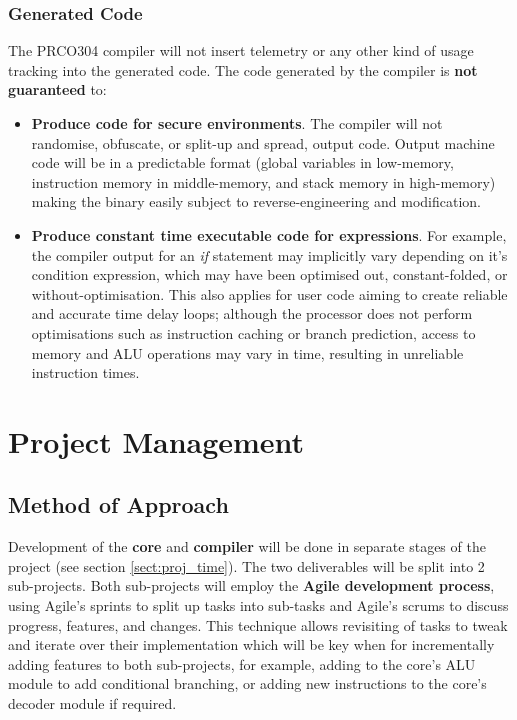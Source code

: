 \documentclass[11pt,a4paper]{report}
\newcommand{\scname}{PRCO304}
\begin{document}
\subsection{Generated Code}
The \scname{} compiler will not insert telemetry or any other kind of usage tracking into the generated code.
The code generated by the compiler is \textbf{not guaranteed} to:
\begin{itemize}
\item{\textbf{Produce code for secure environments}. The compiler will not randomise, obfuscate, or split-up and spread, output code. Output machine code will be in a predictable format (global variables in low-memory, instruction memory in middle-memory, and stack memory in high-memory) making the binary easily subject to reverse-engineering and modification.}
\item{\textbf{Produce constant time executable code for expressions}. For example, the compiler output for an \textit{if} statement may implicitly vary depending on it's condition expression, which may have been optimised out, constant-folded, or without-optimisation. This also applies for user code aiming to create reliable and accurate time delay loops; although the processor does not perform optimisations such as instruction caching or branch prediction, access to memory and ALU operations may vary in time, resulting in unreliable instruction times.}
\end{itemize}



\chapter{Project Management}
{\hypersetup{linkcolor=black}
\startcontents[chapters]
}

\section{Method of Approach}
Development of the \textbf{core} and \textbf{compiler} will be done in separate stages of the project (see section \ref{sect:proj_time}). The two deliverables will be split into 2 sub-projects. Both sub-projects will employ the \textbf{Agile development process}, using Agile's sprints to split up tasks into sub-tasks and Agile's scrums to discuss progress, features, and changes. This technique allows revisiting of tasks to tweak and iterate over their implementation which will be key when for incrementally adding features to both sub-projects, for example, adding to the core's ALU module to add conditional branching, or adding new instructions to the core's decoder module if required.
\end{document}
